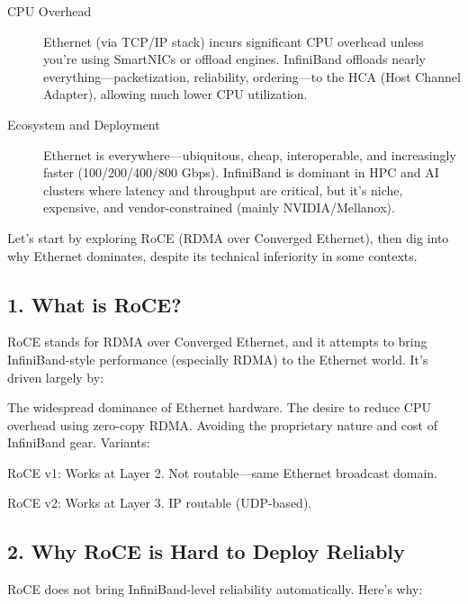 \documentclass[../../../OAE-SPEC-MAIN.tex]{subfiles}
\begin{document}
\begin{description}
\item [CPU Overhead]
Ethernet (via TCP/IP stack) incurs significant CPU overhead unless you’re using SmartNICs or offload engines.
InfiniBand offloads nearly everything—packetization, reliability, ordering—to the HCA (Host Channel Adapter), allowing much lower CPU utilization.

\item [Ecosystem and Deployment]
Ethernet is everywhere—ubiquitous, cheap, interoperable, and increasingly faster (100/200/400/800 Gbps).
InfiniBand is dominant in HPC and AI clusters where latency and throughput are critical, but it's niche, expensive, and vendor-constrained (mainly NVIDIA/Mellanox).
 
 \end{description}
 
 
 
 Let’s start by exploring RoCE (RDMA over Converged Ethernet), then dig into why Ethernet dominates, despite its technical inferiority in some contexts.
 


\subsection{1. What is RoCE?}

RoCE stands for RDMA over Converged Ethernet, and it attempts to bring InfiniBand-style performance (especially RDMA) to the Ethernet world. It’s driven largely by:

The widespread dominance of Ethernet hardware.
The desire to reduce CPU overhead using zero-copy RDMA.
Avoiding the proprietary nature and cost of InfiniBand gear.
Variants:

RoCE v1: Works at Layer 2. Not routable—same Ethernet broadcast domain.

RoCE v2: Works at Layer 3. IP routable (UDP-based).

\subsection{2. Why RoCE is Hard to Deploy Reliably}

RoCE does not bring InfiniBand-level reliability automatically. Here's why:
\end{document}
